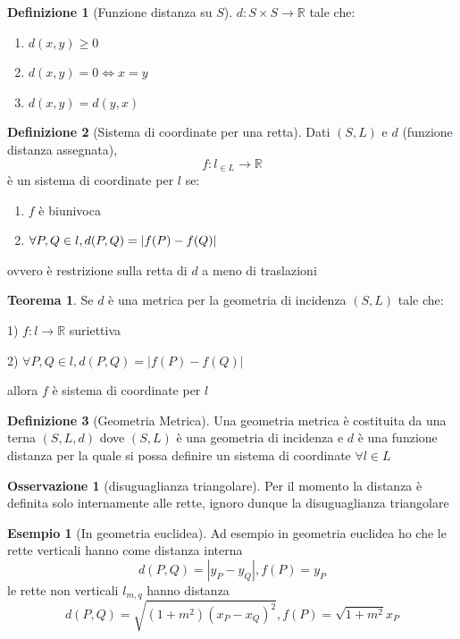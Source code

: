 \documentclass[a4paper,10pt]{article}
\theoremstyle{definition}
\newcommand{\re}{\mathbb{R}} %
\theoremstyle{indentdefinition}
\newtheorem{defn}{Definizione}[section]
\theoremstyle{indentpostulate}
\theoremstyle{indenttheorem}
\newtheorem{thm}{Teorema}[section]
\theoremstyle{myremark}
\newtheorem*{rem*}{Osservazione}
\newtheorem{example*}{Esempio}
\theoremstyle{indentgeneral}
\begin{document}
\begin{defn}[Funzione distanza su $S$]
 $d:S\times S \rightarrow \re$ tale che:
\begin{enumerate}
    \item $d(x,y)\ge 0$
    \item $d(x,y)=0 \iff x=y$
    \item $d(x,y)=d(y,x)$
\end{enumerate}
\end{defn}

\begin{defn}[Sistema di coordinate per una retta] Dati $(S,L)$ e $d$ (funzione distanza assegnata), $$f: l_{\in L} \rightarrow \re$$ è un sistema di coordinate per $l$ se:
\begin{enumerate}
    \item $f$ è biunivoca 
    \item  $\forall P,Q \in l,d(P,Q)=\abs{f(P)-f(Q)}$
\end{enumerate}
ovvero è restrizione sulla retta di $d$ a meno di traslazioni 
\end{defn}

\begin{thm}
    Se $d$ è una metrica per la geometria di incidenza $(S,L)$ tale che:

1) $f:l \rightarrow \re$ suriettiva

2) $\forall P,Q \in l, d(P,Q)=|f(P)-f(Q)|$ 

allora $f$ è sistema di coordinate per $l$
\end{thm} 

\begin{defn}[Geometria Metrica]
    Una geometria metrica è costituita da una terna $(S,L,d)$ dove $(S,L)$ è una geometria di incidenza e $d$ è una funzione distanza per la quale si possa definire un sistema di coordinate $\forall l \in L$

\end{defn}

\begin{rem*}[disuguaglianza triangolare]
    Per il momento la distanza è definita solo internamente alle rette, ignoro dunque la disuguaglianza triangolare
\end{rem*}


\begin{example*}[In geometria euclidea]
    Ad esempio in geometria euclidea ho che le rette verticali hanno come distanza interna 
    $$d(P,Q)= |y_P-y_Q|, f(P)=y_P$$ 
    le rette non verticali $l_{m,q}$ hanno distanza $$d(P,Q)= \sqrt{(1+m^2)(x_P-x_Q)^2}, f(P)=\sqrt{1+m^2} x_P$$
\end{example*}
\end{document}
